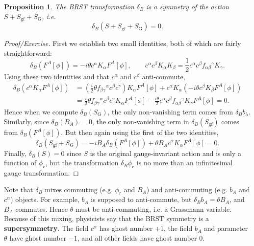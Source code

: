 \documentclass{report}
\theoremstyle{plain}
\newtheorem{proposition}[theorem]{Proposition}
\theoremstyle{definition}
\theoremstyle{remark}
\begin{document}
\begin{proposition}
  The BRST transformation $\delta_B$ is a symmetry of the action $S +
  S_{\text{gf}} + S_{\text{G}}$, i.e.
  \[ \delta_B(S + S_{\text{gf}} + S_{\text{G}}) = 0. \]
\end{proposition}

\begin{proof}[Proof/Exercise]
  First we establish two small identities, both of which are fairly
  straightforward:
  \[ \delta_B(F^A[\phi]) = -i\theta c^\alpha K_\alpha F^A[\phi], \qquad c^\alpha c^\beta K_\alpha K_\beta = \frac{1}{2} c^\alpha c^\beta f_{\alpha\beta}{}^\gamma K_\gamma. \]
  Using these two identities and that $c^\alpha$ and $c^\beta$
  anti-commute,
  \begin{align*}
    \delta_B(c^\alpha K_\alpha F^A[\phi])
    &= \left(\frac{i}{2}\theta f_{\beta\gamma}{}^\alpha c^\beta c^\gamma\right) K_\alpha F^A[\phi] + c^\alpha K_\alpha (-i\theta c^\beta K_\beta F^A[\phi]) \\
    &= \frac{i}{2}\theta f_{\beta\gamma}{}^\alpha c^\beta c^\gamma K_\alpha F^A[\phi] - \frac{i\theta}{2} c^\alpha c^\beta f_{\alpha\beta}{}^\gamma K_\gamma F^A[\phi] = 0.
  \end{align*}
  Hence when we compute $\delta_B(S_{\text{G}})$, the only
  non-vanishing term comes from $\delta_B b_\lambda$. Similarly, since
  $\delta_B(B_A) = 0$, the only non-vanishing term in
  $\delta_B(S_{\text{gf}})$ comes from $\delta_B(F^A[\phi])$. But then
  again using the first of the two identities,
  \[ \delta_B(S_{\text{gf}} + S_{\text{G}}) = -iB_A \delta_B(F^A[\phi]) + \theta B_A c^\alpha K_\alpha F^A[\phi] = 0. \]
  Finally, $\delta_B(S) = 0$ since $S$ is the original gauge-invariant
  action and is only a function of $\phi_r$, but the transformation
  $\delta_B \phi_r$ is no more than an infinitesimal gauge
  transformation.
\end{proof}

Note that $\delta_B$ mixes commuting (e.g. $\phi_r$ and $B_A$) and
anti-commuting (e.g. $b_A$ and $c^\alpha$) objects. For example, $b_A$
is supposed to anti-commute, but $\delta_B b_A = \theta B_A$, and
$B_A$ commutes. Hence $\theta$ must be anti-commuting, i.e. a
Grassmann variable. Because of this mixing, physicists say that the
BRST symmetry is a {\bf supersymmetry}. The field $c^\alpha$ has ghost
number $+1$, the field $b_A$ and parameter $\theta$ have ghost number
$-1$, and all other fields have ghost number $0$.
\end{document}
